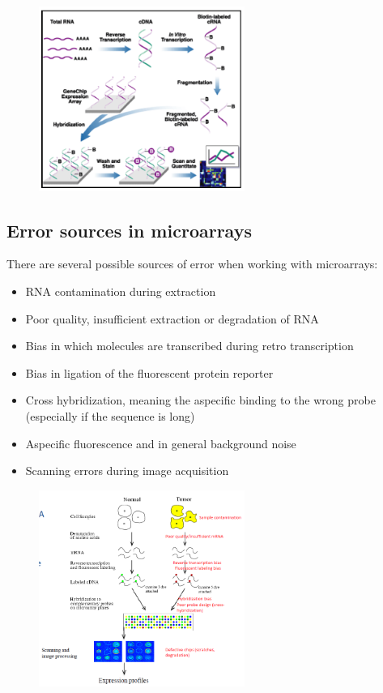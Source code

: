 	  \begin{figure}[ht]
	  \caption{}
	  \centering
	  \includegraphics[width=0.6\textwidth]{microarrays}
	  \end{figure}

    \subsection{Error sources in microarrays}
      There are several possible sources of error when working with microarrays:
      \begin{itemize}
        \item RNA contamination during extraction 
        \item Poor quality, insufficient extraction or degradation of RNA
        \item Bias in which molecules are transcribed during retro transcription
        \item Bias in ligation of the fluorescent protein reporter
        \item Cross hybridization, meaning the aspecific binding to the wrong probe (especially if the sequence is long)
        \item Aspecific fluorescence and in general background noise
        \item Scanning errors during image acquisition
      \end{itemize}

	  \begin{figure}[ht]
	  \caption{}
	  \centering
	  \includegraphics[width=0.6\textwidth]{ProblemsMicarrays}
	  \end{figure}


